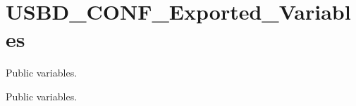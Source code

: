 \hypertarget{group__USBD__CONF__Exported__Variables}{}\section{U\+S\+B\+D\+\_\+\+C\+O\+N\+F\+\_\+\+Exported\+\_\+\+Variables}
\label{group__USBD__CONF__Exported__Variables}


Public variables.  


Public variables. 

